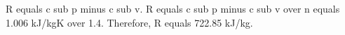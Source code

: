 R equals c sub p minus c sub v. R equals c sub p minus c sub v over n equals 1.006 kJ/kgK over 1.4. Therefore, R equals 722.85 kJ/kg.